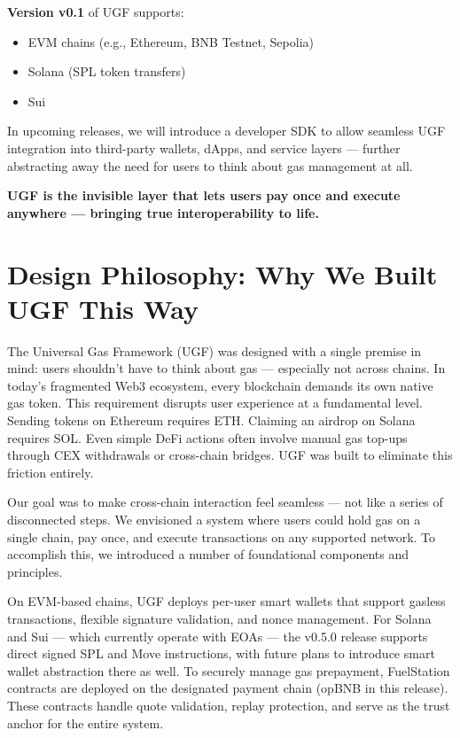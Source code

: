 \documentclass{article}
\begin{document}
\textbf{Version v0.1} of UGF supports:
\begin{itemize}
  \item EVM chains (e.g., Ethereum, BNB Testnet, Sepolia)
  \item Solana (SPL token transfers)
  \item Sui
\end{itemize}

In upcoming releases, we will introduce a developer SDK to allow seamless UGF integration into third-party wallets, dApps, and service layers — further abstracting away the need for users to think about gas management at all.

\textbf{UGF is the invisible layer that lets users pay once and execute anywhere — bringing true interoperability to life.}



\section*{Design Philosophy: Why We Built UGF This Way}

The Universal Gas Framework (UGF) was designed with a single premise in mind: users shouldn’t have to think about gas — especially not across chains. In today’s fragmented Web3 ecosystem, every blockchain demands its own native gas token. This requirement disrupts user experience at a fundamental level. Sending tokens on Ethereum requires ETH. Claiming an airdrop on Solana requires SOL. Even simple DeFi actions often involve manual gas top-ups through CEX withdrawals or cross-chain bridges. UGF was built to eliminate this friction entirely.

Our goal was to make cross-chain interaction feel seamless — not like a series of disconnected steps. We envisioned a system where users could hold gas on a single chain, pay once, and execute transactions on any supported network. To accomplish this, we introduced a number of foundational components and principles.

On EVM-based chains, UGF deploys per-user smart wallets that support gasless transactions, flexible signature validation, and nonce management. For Solana and Sui — which currently operate with EOAs — the v0.5.0 release supports direct signed SPL and Move instructions, with future plans to introduce smart wallet abstraction there as well. To securely manage gas prepayment, FuelStation contracts are deployed on the designated payment chain (opBNB in this release). These contracts handle quote validation, replay protection, and serve as the trust anchor for the entire system.
\end{document}
